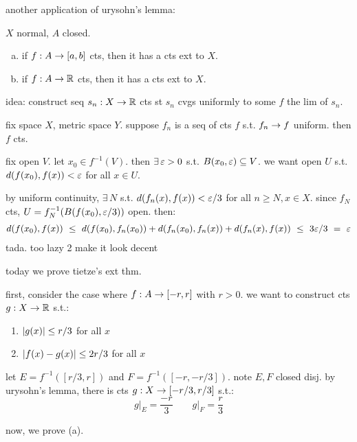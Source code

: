 another application of urysohn's lemma:
\begin{thm}[title=Tietze's Extension Theorem]
    $X$ normal, $A$ closed.
    \begin{enumerate}[(a)]
        \item if $f:A\rightarrow[a,b]$ cts, then it has a cts ext to $X$.
        \item if $f:A\rightarrow\mathbb{R}$ cts, then it has a cts ext to $X$.
    \end{enumerate}
\end{thm}
idea: construct seq $s_{n}:X\rightarrow\mathbb{R}$ cts st $s_{n}$ cvgs uniformly to some $f$
the lim of $s_{n}$.

\begin{lm}
    fix space $X$, metric space $Y$.
    suppose $f_{n}$ is a seq of cts $f$ s.t. $f_{n}\rightarrow f$ uniform.
    then $f$ cts.
\end{lm}

\begin{pf}[source=Primary Source Material]
    fix open $V$. let $x_{0}\in f^{-1}(V)$.
    then $\exists \, \varepsilon>0$ s.t. $B(x_{0},\varepsilon)\subseteq V$.
    we want open $U$ s.t. $d(f(x_{0}),f(x))<\varepsilon$ for all $x\in U$.

    by uniform continuity, $\exists \, N$ s.t. $d(f_{n}(x),f(x))<\varepsilon/3$ for all
    $n\geq N,x\in X$.
    since $f_{N}$ cts, $U=f_{N}^{-1}(B(f(x_{0}),\varepsilon/3))$ open. then:
    \begin{gather*}
        d(f(x_{0}),f(x)) \ \leq \
        d(f(x_{0}),f_{n}(x_{0})) + d(f_{n}(x_{0}),f_{n}(x)) + d(f_{n}(x),f(x))
        \ \leq \ 3\varepsilon/3 \ = \ \varepsilon
    \end{gather*}
    tada. too lazy 2 make it look decent
\end{pf}

\newpage
{}
today we prove tietze's ext thm.

first, consider the case where $f:A\rightarrow[-r,r]$ with $r>0$.
we want to construct cts $g:X\rightarrow\mathbb{R}$ s.t.:
\begin{enumerate}[(1)]
    \item $\abs{g(x)}\leq r/3$ for all $x$
    \item $\abs{f(x)-g(x)}\leq 2r/3$ for all $x$
\end{enumerate}
\begin{block}
    let $E=f^{-1}([r/3,r])$ and $F=f^{-1}([-r,-r/3])$. note $E,F$ closed disj.
    by urysohn's lemma, there is cts $g:X\rightarrow[-r/3,r/3]$ s.t.:
    \begin{equation*}
        g\rvert_{E}=\frac{-r}{3} \qquad g\rvert_{F}=\frac{r}{3}
    \end{equation*}
\end{block}
now, we prove (a).

